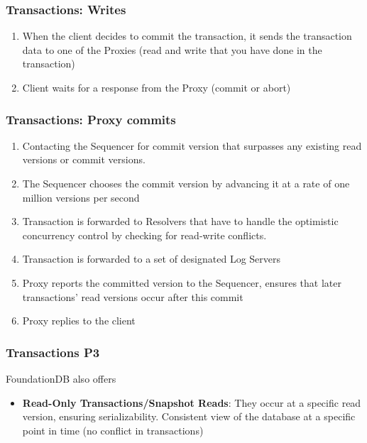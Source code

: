 \begin{frame}
	\frametitle{Transactions: Writes}
\begin{enumerate}
    \item When the client decides to commit the transaction, it sends the transaction data to one of the Proxies (read and write that you have done in the transaction)
    \item Client waits for a response from the Proxy (commit or abort)

\end{enumerate}

\end{frame}




\begin{frame}
	\frametitle{Transactions: Proxy commits}
\begin{enumerate}
    \item Contacting the Sequencer for commit version that surpasses any existing read versions or commit versions.
    \item The Sequencer chooses the commit version by advancing it at a rate of one million versions per second
    \item Transaction is forwarded to Resolvers that have to handle the optimistic concurrency control by checking for read-write conflicts.
    \item Transaction is forwarded to a set of designated Log Servers
    \item Proxy reports the committed version to the Sequencer, ensures that later transactions' read versions occur after this commit
    \item Proxy replies to the client
\end{enumerate}
\end{frame}


\begin{frame}
	\frametitle{Transactions P3}

 FoundationDB also offers
 
 \begin{itemize}
     \item \textbf{Read-Only Transactions/Snapshot Reads}: They occur at a specific read version, ensuring serializability. Consistent view of the database at a specific point in time (no conflict in transactions)
 \end{itemize}

\end{frame}



